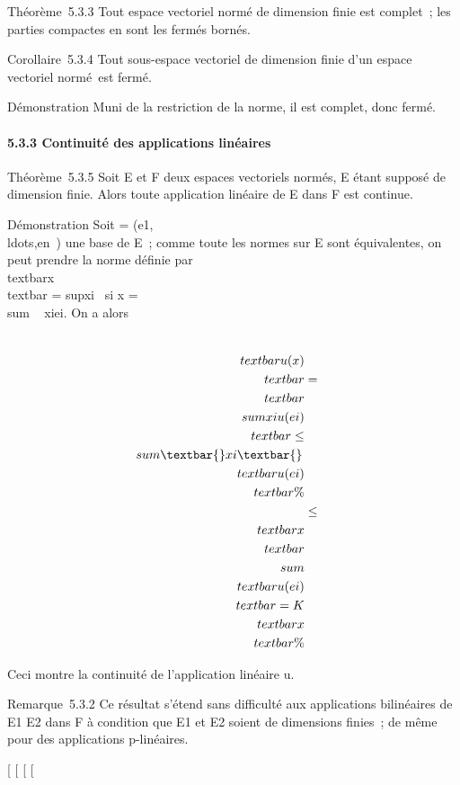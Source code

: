 Théorème~5.3.3 Tout espace vectoriel normé de dimension finie est
complet~; les parties compactes en sont les fermés bornés.

Corollaire~5.3.4 Tout sous-espace vectoriel de dimension finie d'un
espace vectoriel normé~est fermé.

Démonstration Muni de la restriction de la norme, il est complet, donc
fermé.

\paragraph{5.3.3 Continuité des applications linéaires}

Théorème~5.3.5 Soit E et F deux espaces vectoriels normés, E étant
supposé de dimension finie. Alors toute application linéaire de E dans F
est continue.

Démonstration Soit  =
(e1,\\ldots,en~)
une base de E~; comme toute les normes sur E sont équivalentes, on peut
prendre la norme définie par
\\textbar{}x\\textbar{}
= sup\textbar{}xi~\textbar{} si x
= \\sum ~
xiei. On a alors

\begin{align*}
\\textbar{}u(x)\\textbar{}& =&
\\textbar{}\\sum
xiu(ei)\\textbar{}
\leq\\sum
\textbar{}xi\textbar{}\,\\textbar{}u(ei)\\textbar{}\%&
\\ & \leq&
\\textbar{}x\\textbar{}\\sum
\\textbar{}u(ei)\\textbar{} =
K\\textbar{}x\\textbar{} \%&
\\ \end{align*}

Ceci montre la continuité de l'application linéaire u.

Remarque~5.3.2 Ce résultat s'étend sans difficulté aux applications
bilinéaires de E1 \times E2 dans F à condition que
E1 et E2 soient de dimensions finies~; de même pour
des applications p-linéaires.

{[}
{[}
{[}
{[}
